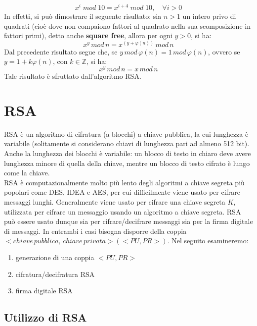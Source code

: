 \begin{equation}
x^i \; mod \; 10 = x^{i + 4} \; mod \; 10, \quad \forall i>0
\end{equation}
In effetti, si può dimostrare il seguente risultato: sia $n > 1$ un intero privo di quadrati (cioè dove non compaiono fattori al quadrato nella sua scomposizione in fattori primi), detto anche \textbf{square free}, allora per ogni $y > 0$, si ha: 
\begin{equation}
x^y \, mod \, n = x^{(y + \varphi(n) )} \, mod \, n
\end{equation} 
Dal precedente risultato segue che, se $ y \, mod \, \varphi(n) = 1 \, mod \, \varphi(n) $, ovvero se $y = 1 + k \varphi(n) $, con $k \in \mathbb{Z}$, si ha:
\begin{equation}
x^y \, mod \, n = x \, mod \, n
\end{equation}
Tale risultato è sfruttato dall'algoritmo RSA.

\section{RSA}

RSA è un algoritmo di cifratura (a blocchi) a chiave pubblica, la cui lunghezza è variabile (solitamente si considerano chiavi di lunghezza pari ad almeno 512 bit). Anche la lunghezza dei blocchi è variabile: un blocco di testo in chiaro deve avere lunghezza minore di quella della chiave, mentre un blocco di testo cifrato è lungo come la chiave. \\
RSA è computazionalmente molto più lento degli algoritmi a chiave segreta più popolari come DES, IDEA e AES, per cui difficilmente viene usato per cifrare messaggi lunghi. Generalmente viene usato per cifrare una chiave segreta $K$, utilizzata per cifrare un messaggio usando un algoritmo a chiave segreta. RSA può essere usato dunque sia per cifrare/decifrare messaggi sia per la firma digitale di messaggi. In entrambi i casi bisogna disporre della coppia $<chiave \, pubblica, \,  chiave \, privata>(<PU,PR>)$. Nel seguito esamineremo:
\begin{enumerate}
\item generazione di una coppia $<PU,PR>$
\item cifratura/decifratura RSA
\item firma digitale RSA
\end{enumerate}

\subsection{Utilizzo di RSA} \label{sec:ut_rsa}

